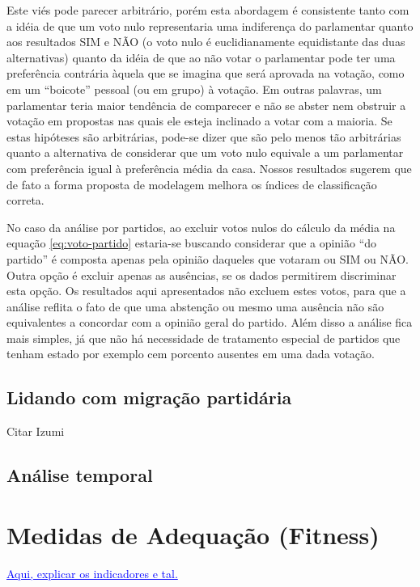 \documentclass[a4paper, 12pt]{article}
\newcommand{\ins}[1]{\textcolor{blue}{\uline{#1}}} %
\begin{document}
Este viés pode parecer arbitrário, porém esta abordagem é consistente tanto com a idéia de que um voto nulo representaria uma indiferença do parlamentar quanto aos resultados SIM e NÃO (o voto nulo é euclidianamente equidistante das duas alternativas) quanto da idéia de que ao não votar o parlamentar pode ter uma preferência contrária àquela que se imagina que será aprovada na votação, como em um ``boicote'' pessoal (ou em grupo) à votação. Em outras palavras, um parlamentar teria maior tendência de comparecer e não se abster nem obstruir a votação em propostas nas quais ele esteja inclinado a votar com a maioria. Se estas hipóteses são arbitrárias, pode-se dizer que são pelo menos tão arbitrárias quanto a alternativa de considerar que um voto nulo equivale a um parlamentar com preferência igual à preferência média da casa. Nossos resultados sugerem que de fato a forma proposta de modelagem melhora os índices de classificação correta.

No caso da análise por partidos, ao excluir votos nulos do cálculo da média na equação \ref{eq:voto-partido} estaria-se buscando considerar que a opinião ``do partido'' é composta apenas pela opinião daqueles que votaram ou SIM ou NÃO. Outra opção é excluir apenas as ausências, se os dados permitirem discriminar esta opção. Os resultados aqui apresentados não excluem estes votos, para que a análise reflita o fato de que uma abstenção ou mesmo uma ausência não são equivalentes a concordar com a opinião geral do partido. Além disso a análise fica mais simples, já que não há necessidade de tratamento especial de partidos que tenham estado por exemplo cem porcento ausentes em uma dada votação.

\subsection*{Lidando com migração partidária}

Citar Izumi

\subsection*{Análise temporal}



\section{Medidas de Adequação (Fitness)}
\label{sec:metodo}

\ins{Aqui, explicar os indicadores e tal.}
\end{document}
